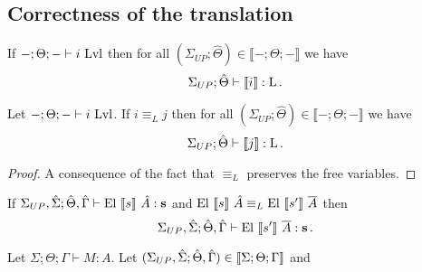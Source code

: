 \documentclass[]{StandardTemplate}
\begin{document}
\subsection{Correctness of the translation}
\label{subsec:correct}

\begin{thm}
If $ -; \Theta; - \vdash i~\text{Lvl} $ then for all $ (\Sigma_{UP};\hat{\Theta}) \in \llbracket -;\Theta;- \rrbracket $ we have \[
\Sigma_{UP};\hat{\Theta} \vdash \llbracket i \rrbracket : \text{L}
\,.\]
\end{thm}

\begin{thm}[]
Let $ -;\Theta;- \vdash i~\text{Lvl} $. If $ i \equiv_L j $ then for  all $ (\Sigma_{UP};\hat{\Theta}) \in \llbracket -;\Theta;- \rrbracket $ we have \[
\Sigma_{UP};\hat{\Theta} \vdash \llbracket j \rrbracket : \text{L}
\,.\]
\end{thm}
\begin{proof}
A consequence of the fact that $ \equiv_L $ preserves the free variables.
\end{proof}

\begin{thm}[]
If $ \Sigma_{UP}, \hat{\Sigma}; \hat{\Theta}, \hat{\Gamma} \vdash \text{El}~\llbracket s \rrbracket~\hat{A} : \textbf{s}$ and $ \text{El}~\llbracket s \rrbracket~\hat{A} \equiv_L \text{El}~\llbracket s' \rrbracket~\overline{A} $ then \[
 \Sigma_{UP}, \hat{\Sigma}; \hat{\Theta}, \hat{\Gamma} \vdash \text{El}~\llbracket s' \rrbracket~\overline{A} : \textbf{s}
  \,.\]
\end{thm}


\begin{cor}
Let $ \Sigma; \Theta; \Gamma \vdash M : A $. Let $ (\Sigma_{UP}, \hat{\Sigma};\hat{\Theta}, \hat{\Gamma}) \in \llbracket {\Sigma;\Theta;\Gamma} \rrbracket $ and $  $
\end{cor}
\end{document}
